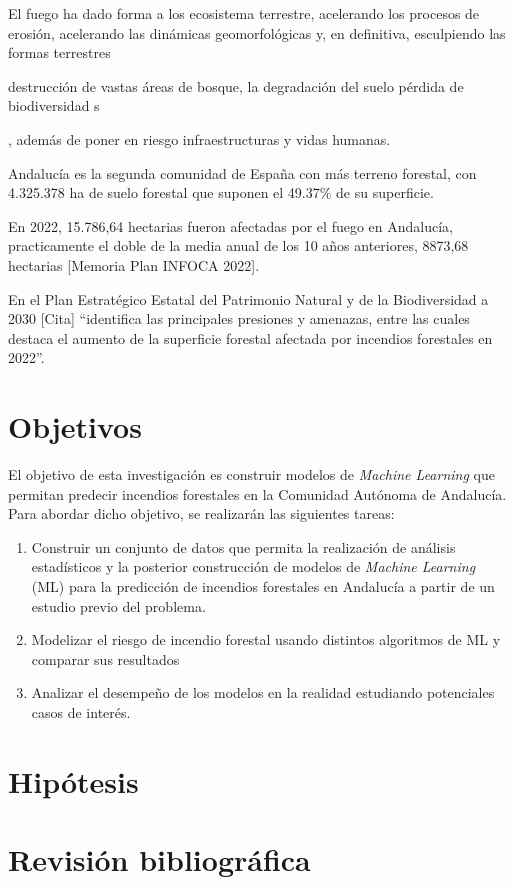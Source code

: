 \documentclass[12pt,a4paper,]{book}
\numberwithin{dummy}{section}
\theoremstyle{ocrenumbox}
\theoremstyle{blacknumex}
\theoremstyle{blacknumbox}
\theoremstyle{ocrenum}
\theoremstyle{ocrenum}
\begin{document}
El fuego ha dado forma a los ecosistema terrestre, acelerando los
procesos de erosión, acelerando las dinámicas geomorfológicas y, en
definitiva, esculpiendo las formas terrestres

destrucción de vastas áreas de bosque, la degradación del suelo pérdida
de biodiversidad s

, además de poner en riesgo infraestructuras y vidas humanas.

Andalucía es la segunda comunidad de España con más terreno forestal,
con 4.325.378 ha de suelo forestal que suponen el 49.37\% de su
superficie.

En 2022, 15.786,64 hectarias fueron afectadas por el fuego en Andalucía,
practicamente el doble de la media anual de los 10 años anteriores,
8873,68 hectarias {[}Memoria Plan INFOCA 2022{]}.

En el Plan Estratégico Estatal del Patrimonio Natural y de la
Biodiversidad a 2030 {[}Cita{]} ``identifica las principales presiones y
amenazas, entre las cuales destaca el aumento de la superficie forestal
afectada por incendios forestales en 2022''.

\hypertarget{objetivos}{%
\section{Objetivos}\label{objetivos}}

El objetivo de esta investigación es construir modelos de \emph{Machine
Learning} que permitan predecir incendios forestales en la Comunidad
Autónoma de Andalucía. Para abordar dicho objetivo, se realizarán las
siguientes tareas:

\begin{enumerate}
\def\labelenumi{\arabic{enumi}.}
\item
  Construir un conjunto de datos que permita la realización de análisis
  estadísticos y la posterior construcción de modelos de \emph{Machine
  Learning} (ML) para la predicción de incendios forestales en Andalucía
  a partir de un estudio previo del problema.
\item
  Modelizar el riesgo de incendio forestal usando distintos algoritmos
  de ML y comparar sus resultados
\item
  Analizar el desempeño de los modelos en la realidad estudiando
  potenciales casos de interés.
\end{enumerate}

\hypertarget{hipuxf3tesis}{%
\section{Hipótesis}\label{hipuxf3tesis}}

\hypertarget{revisiuxf3n-bibliogruxe1fica}{%
\section{Revisión bibliográfica}\label{revisiuxf3n-bibliogruxe1fica}}




%
\end{document}
